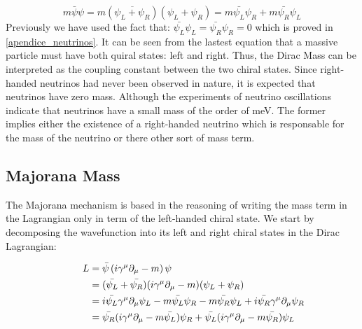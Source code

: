 \begin{equation}
 m \bar{\psi} \psi = m \left( \overbar{\psi_L + \psi_R} \right) \left( \psi_L + \psi_R \right) = m \bar{\psi_L} \psi_R + m \bar{\psi_R}\psi_L
\end{equation} \label{Dirac mass term}
Previously we have used the fact that: $\bar{\psi_L}\psi_L = \bar{\psi_R}\psi_R = 0$ which is proved in \ref{apendice_neutrinos}. It can be seen from the lastest equation
that a massive particle must have both quiral states: left and right. Thus, the Dirac Mass can be interpreted as the coupling constant between the two chiral states. Since right-handed 
neutrinos had never been observed in nature, it is expected that neutrinos have zero mass. Although the experiments of neutrino oscillations indicate that neutrinos have a small mass of the order of meV. The former implies either the existence of a right-handed neutrino which is responsable for the mass of the neutrino or there other sort of mass term.

\subsection{Majorana Mass}


The Majorana mechanism is based in the reasoning of writing the mass term in the Lagrangian only in term of the left-handed chiral state. We start by decomposing the wavefunction into its left and right chiral states in the Dirac Lagrangian: 


\begin{align}
  \phantom{i = j = k}
  &\begin{aligned}
    \mathllap{L} &= \bar{\psi} \left( i \gamma ^\mu \partial_{\mu} - m \right) \psi \\
    \mathllap{}  &= (\bar{\psi_L} + \bar{\psi_R})( i \gamma ^\mu \partial_{\mu} - m)(\psi_L + \psi_R) \\
   \mathllap{} &= i \bar{\psi_L} \gamma ^\mu \partial_{\mu} \psi_L - m \bar{\psi_L} \psi_R - m \bar{\psi_R} \psi_L + i \bar{\psi_R} \gamma ^\mu \partial_{\mu} \psi_R \\
   \mathllap{} &= \bar{\psi_R} (i \gamma^\mu \partial_{\mu} - m\bar{\psi_L}) \psi_R + \bar{\psi_L} (i \gamma^\mu \partial_\mu - m \bar{\psi_R}) \psi_L
   \end{aligned}
\end{align}

